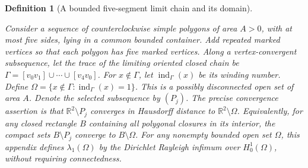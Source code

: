 \documentclass[11pt,a4paper]{article}
\theoremstyle{proofmanuscript}
\newtheorem{definition}[theorem]{Definition}
\begin{document}
\begin{definition}[A bounded five-segment limit chain and its domain]\label{def-polygonal-limit}

Consider a sequence of counterclockwise simple polygons of area \(A>0\), with at most five sides, lying in a common bounded container. Add repeated marked vertices so that each polygon has five marked vertices. Along a vertex-convergent subsequence, let the trace of the limiting oriented closed chain be \(\Gamma=[v_0v_1]\cup\cdots\cup[v_4v_0]\). For \(x\notin\Gamma\), let \(\operatorname{ind}_\Gamma(x)\) be its winding number. Define \(\Omega=\{x\notin\Gamma:\operatorname{ind}_\Gamma(x)=1\}\). This is a possibly disconnected open set of area \(A\). Denote the selected subsequence by \((P_j)\). The precise convergence assertion is that \(\mathbb R^2\setminus P_j\) converges in Hausdorff distance to \(\mathbb R^2\setminus\Omega\). Equivalently, for any closed rectangle \(B\) containing all polygonal closures in its interior, the compact sets \(B\setminus P_j\) converge to \(B\setminus\Omega\). For any nonempty bounded open set \(\Omega\), this appendix defines \(\lambda_1(\Omega)\) by the Dirichlet Rayleigh infimum over \(H_0^1(\Omega)\), without requiring connectedness.

\end{definition}
\end{document}
